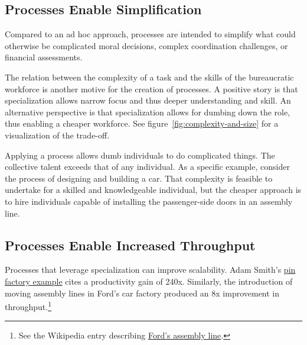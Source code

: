 


\subsection*{Processes Enable Simplification}
Compared to an ad hoc approach, processes are intended to simplify what could otherwise be complicated moral decisions, complex coordination challenges, or financial assessments. %


The relation between the complexity of a task and the skills of the bureaucratic workforce is another motive for the creation of processes.
A positive story is that specialization allows narrow focus and thus deeper understanding and skill. An alternative perspective is that specialization allows for dumbing down the role, thus enabling a cheaper workforce. See figure~\ref{fig:complexity-and-size} \iftoggle{haspagenumbers}{on page~\pageref{fig:complexity-and-size}}{}
for a visualization of the trade-off.

Applying a process allows dumb individuals to do complicated things. The collective talent exceeds that of any individual.  As a specific example, consider the process of designing and building a car. That complexity is feasible to undertake for a skilled and knowledgeable individual, but the cheaper approach is to hire individuals capable of installing the passenger-side doors in an assembly line.


\subsection*{Processes Enable Increased Throughput}

Processes that leverage specialization can improve scalability. Adam Smith's \href{https://en.wikipedia.org/wiki/Business_process\%23Adam_Smith}{pin factory example} cites a productivity gain of 240x.
Similarly, the introduction of moving assembly lines in Ford's car factory produced an 8x improvement in throughput.\footnote{See the Wikipedia entry describing \href{https://en.wikipedia.org/wiki/Assembly_line\%2320th_century}{Ford's assembly line}.
} 


